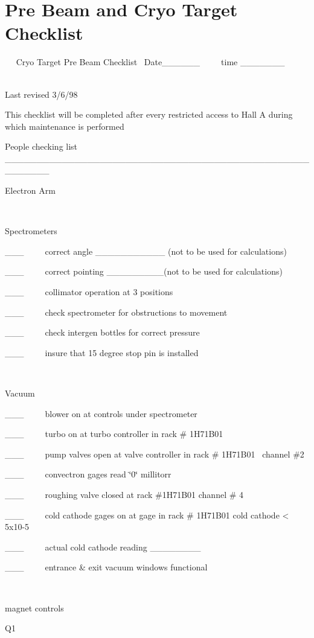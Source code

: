 \section{Pre Beam and Cryo Target Checklist }
~
~Cryo Target Pre Beam Checklist~ Date\_\_\_\_\_\_~~~~~time \_\_\_\_\_\_\_~~ 

~~~~~~~~~~~~~~~~~~~~~~~~~~~~~~~~~~~~~~~~~~~~~~~~~~~~~~~~~~~~~~~~~~~~~~~~Last
revised 3/6/98

This checklist will be completed after every restricted access to Hall A during
which maintenance is performed

People checking list \_\_\_\_\_\_\_\_\_\_\_\_\_\_\_\_\_\_\_\_\_\_\_\_\_\_\_\_\_\_\_\_\_\_\_\_\_\_\_\_\_\_\_\_\_\_\_\_\_\_\_\_\_\_\_

Electron Arm

~

Spectrometers

\_\_\_~~~~~correct angle \_\_\_\_\_\_\_\_\_\_\_ (not to be used for calculations)

\_\_\_~~~~~correct pointing \_\_\_\_\_\_\_\_\_(not to be used for calculations)

\_\_\_~~~~~collimator operation at 3 positions

\_\_\_~~~~~check spectrometer for obstructions to movement

\_\_\_~~~~~check intergen bottles for correct pressure

\_\_\_~~~~~insure that 15 degree stop pin is installed

~

Vacuum 

\_\_\_~~~~~blower on at controls under spectrometer

\_\_\_~~~~~turbo on at turbo controller in rack \# 1H71B01

\_\_\_~~~~~pump valves open at valve controller in rack \# 1H71B01~ channel
\#2 

\_\_\_~~~~~convectron gages read \char`\"{}0\char`\"{} millitorr 

\_\_\_~~~~~roughing valve closed at rack \#1H71B01 channel \# 4 

\_\_\_~~~~~cold cathode gages on at gage in rack \# 1H71B01 cold cathode < 5x10-5

\_\_\_~~~~~actual cold cathode reading \_\_\_\_\_\_\_\_

\_\_\_~~~~~entrance \& exit vacuum windows functional

~

magnet controls

Q1

